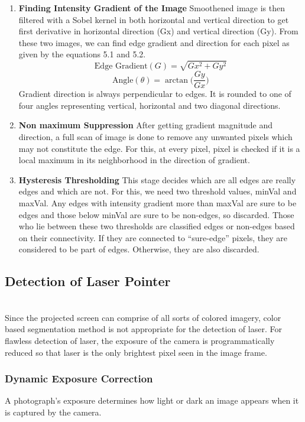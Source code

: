 \documentclass[12pt, a4paper]{article}
\begin{document}
{\begin{enumerate}
\item \textbf{Finding Intensity Gradient of the Image}
Smoothened image is then filtered with a Sobel kernel in both horizontal and vertical direction to get first derivative in horizontal direction (Gx) and vertical direction (Gy). From these two images, we can find edge gradient and direction for each pixel as given by the equations 5.1 and 5.2.
\begin{equation}
\text{Edge Gradient}(G) = \sqrt{Gx^2 + Gy^2}
\end{equation}
\begin{equation}
\text{Angle}(\theta) = \arctan\bigg(\frac{Gy}{Gx}\bigg)
\end{equation}
Gradient direction is always perpendicular to edges. It is rounded to one of four angles   representing vertical, horizontal and two diagonal directions.
\item \textbf{Non maximum Suppression}
After getting gradient magnitude and direction, a full scan of image is done to remove any unwanted pixels which may not constitute the edge. For this, at every pixel, pixel is checked ­if it is a local maximum in its neighborhood in the direction of gradient.

\item \textbf{Hysteresis Thresholding}
This stage decides which are all edges are really edges and which are not. For this, we need two threshold values, minVal and maxVal. Any edges with intensity gradient more than maxVal are sure to be edges and those below minVal are sure to be non-edges, so discarded. Those who lie between these two thresholds are classified edges or non-edges based on their connectivity. If they are connected to “sure-edge” pixels, they are considered to be part of edges. Otherwise, they are also discarded.
\end{enumerate}
	
\subsection{Detection of Laser Pointer}
~\\
	Since the projected screen can comprise of all sorts of colored imagery, color based segmentation method is not appropriate for the detection of laser. For flawless detection of laser, the exposure of the camera is programmatically reduced so that laser is the only brightest pixel seen in the image frame. 
	\subsubsection{Dynamic Exposure Correction}
	A photograph's exposure determines how light or dark an image appears when it is captured by the camera. 
	
}
\end{document}
